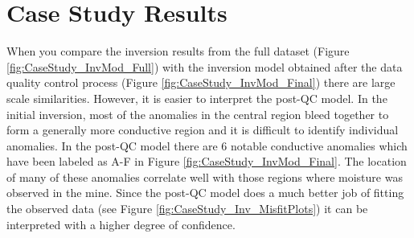 \documentclass[final,authoryear,5p,times,twocolumn]{elsarticle}
\begin{document}
\section{Case Study Results}
\label{Case_Study_Results}

When you compare the inversion results from the full dataset (Figure \ref{fig:CaseStudy_InvMod_Full}) with the inversion model obtained after the data quality control process (Figure \ref{fig:CaseStudy_InvMod_Final}) there are large scale similarities. However, it is easier to interpret the post-QC model. In the initial inversion, most of the anomalies in the central region bleed together to form a generally more conductive region and it is difficult to identify individual anomalies. In the post-QC model there are 6 notable conductive anomalies which have been labeled as A-F in Figure \ref{fig:CaseStudy_InvMod_Final}. The location of many of these anomalies correlate well with those regions where moisture was observed in the mine. Since the post-QC model does a much better job of fitting the observed data (see Figure \ref{fig:CaseStudy_Inv_MisfitPlots}) it can be interpreted with a higher degree of confidence.
\end{document}
